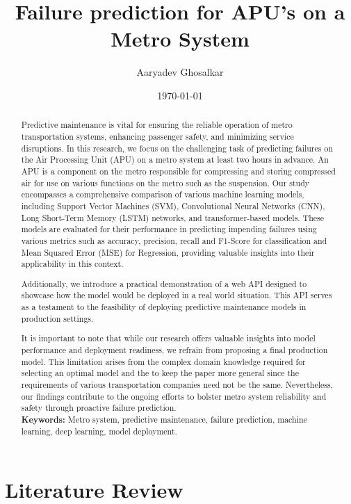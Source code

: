 \documentclass{article}
\title{Failure prediction for APU's on a Metro System}
\author{Aaryadev Ghosalkar}
\date{\today}
\begin{document}
\maketitle

\begin{abstract}
Predictive maintenance is vital for ensuring the reliable operation of metro transportation systems, enhancing passenger safety, and minimizing service disruptions. In this research, we focus on the challenging task of predicting failures on the Air Processing Unit (APU) on a metro system at least two hours in advance. An APU is a component on the metro responsible for compressing and storing compressed air for use on various functions on the metro such as the suspension. Our study encompasses a comprehensive comparison of various machine learning models, including Support Vector Machines (SVM), Convolutional Neural Networks (CNN), Long Short-Term Memory (LSTM) networks, and transformer-based models. These models are evaluated for their performance in predicting impending failures using various metrics such as accuracy, precision, recall and F1-Score for classification and Mean Squared Error (MSE) for Regression, providing valuable insights into their applicability in this context.

Additionally, we introduce a practical demonstration of a web API designed to showcase how the model would be deployed in a real world situation. This API serves as a testament to the feasibility of deploying predictive maintenance models in production settings.

It is important to note that while our research offers valuable insights into model performance and deployment readiness, we refrain from proposing a final production model. This limitation arises from the complex domain knowledge required for selecting an optimal model and the to keep the paper more general since the requirements of various transportation companies need not be the same. Nevertheless, our findings contribute to the ongoing efforts to bolster metro system reliability and safety through proactive failure prediction. \\

\textbf{Keywords:} Metro system, predictive maintenance, failure prediction, machine learning, deep learning, model deployment.
\end{abstract}

\newpage

\section{Literature Review}
\end{document}
